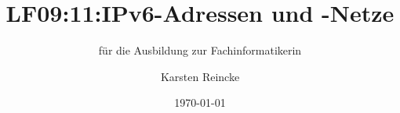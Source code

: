 \documentclass[]{beamer}
\title{LF09:11:IPv6-Adressen und -Netze}
\subtitle{für die Ausbildung zur Fachinformatikerin}
\institute[GS-LDK]{Gewerbliche Schulen Dillenburg}
\author{Karsten Reincke}
\date{\today}
\def\cfgGl{../../../cfg.gl/}
\begin{document}

\begin{frame}
  \titlepage

  
\end{frame}






\logo{}
\newpage



%
\end{document}
